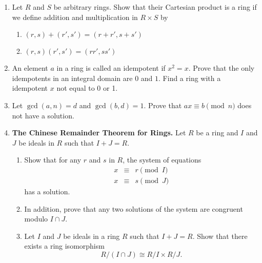 {\begin{enumerate}
\begin{enumerate}
 \bf\item\rm
Let $U(R)$ be the group of units in $R$. Prove that the map
\[
\phi : U(R) \rightarrow Inn(R)
\]
defined by $u \mapsto i_u$ is a homomorphism.  Determine the kernel of
$\phi$. 
 
 \bf\item\rm
Compute $Aut( {\Bbb Z})$, $Inn( {\Bbb Z})$,  and $U( {\Bbb Z})$. 
 
\end{enumerate}
 
 
\bf\item\rm
Let $R$ and $S$ be arbitrary rings.  Show that their Cartesian product
is a ring if we define addition and multiplication in $R \times S$  by 
\begin{enumerate}
 
 \bf\item\rm
$(r, s) + (r', s') = ( r + r', s + s')$
 
 \bf\item\rm
$(r, s)(r', s') = ( rr', ss')$
 
\end{enumerate}
 
 
\bf\item\rm
An element $a$ in a ring is called an {\bfi
idempotent\/} if $x^2 = x$.
Prove that the only idempotents in an integral domain are $0$ and $1$. 
Find a ring with a idempotent $x$ not equal to 0 or 1.
 
\bf\item\rm
Let $\gcd(a, n) = d$ and $\gcd(b, d) = 1$.  Prove that $ax \equiv b
\pmod{n}$ does not have a solution.
 
\bf\item\rm
{\bf The Chinese Remainder Theorem for Rings.}
Let $R$ be a ring and $I$ and $J$ be ideals in $R$ such that $I+J =
R$. 
\begin{enumerate}
 
  \bf\item\rm
Show that for any $r$ and $s$ in $R$, the system of equations
\begin{eqnarray*}
x & \equiv & r \pmod{I} \\
x & \equiv & s \pmod{J}
\end{eqnarray*}
has a solution.  
 
  \bf\item\rm
In addition, prove that any two solutions of the system are congruent
modulo $I \cap J$. 
 
  \bf\item\rm
Let $I$ and $J$ be ideals in a ring $R$ such that $I + J = R$. Show
that there exists a ring isomorphism
\[
R/(I \cap J) \cong R/I \times R/J.
\]
\end{enumerate}
 
 
 
\end{enumerate}
}
 
